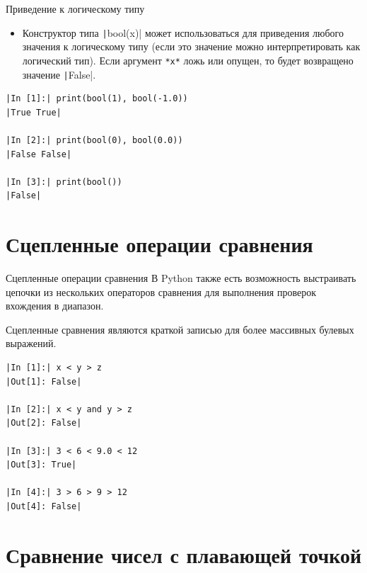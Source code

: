 \documentclass[aspectratio=169]{beamer}	%
\begin{document}
\begin{frame}[fragile]{Приведение к логическому типу}
\scriptsize
\begin{itemize}
	\item Конструктор типа \texttt|bool(x)| может использоваться для приведения любого значения к логическому типу (если это значение можно интерпретировать как логический тип). Если аргумент \texttt{*x*} ложь или опущен, то будет возвращено значение \texttt|False|.
\end{itemize}

\begin{verbatim}
|In [1]:| print(bool(1), bool(-1.0))
|True True|

|In [2]:| print(bool(0), bool(0.0))
|False False|

|In [3]:| print(bool())
|False|
\end{verbatim}
\vfill
\end{frame}

\section{Сцепленные операции сравнения}
\sectionframe


\begin{frame}[fragile]{Сцепленные операции сравнения}
\scriptsize
В Python также есть возможность выстраивать цепочки из нескольких операторов сравнения для выполнения проверок вхождения в диапазон. 

Сцепленные сравнения являются краткой записью для более массивных булевых выражений.

\begin{verbatim}
|In [1]:| x < y > z
|Out[1]: False|

|In [2]:| x < y and y > z
|Out[2]: False|

|In [3]:| 3 < 6 < 9.0 < 12
|Out[3]: True|

|In [4]:| 3 > 6 > 9 > 12
|Out[4]: False|
\end{verbatim}
\vfill
\end{frame}


\section{Сравнение чисел с плавающей точкой}
\sectionframe
\end{document}
